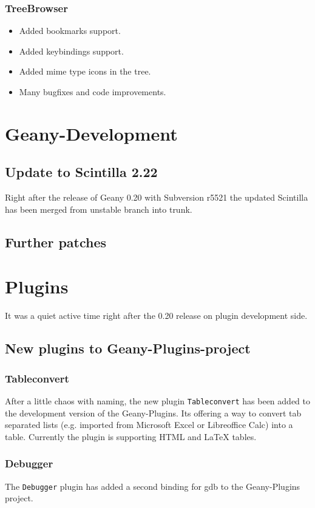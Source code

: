 \documentclass[%
paper=a4,%
fontsize=11pt,%
twoside=false,%
DIV18,
headsepline,
plainheadsepline,
footsepline,
plainfootsepline,
parskip=half,%
openany,%
]{scrartcl}
\begin{document}
\subsubsection{TreeBrowser}
\begin{itemize}
	\item Added bookmarks support.
	\item Added keybindings support.
	\item Added mime type icons in the tree.
	\item Many bugfixes and code improvements.
\end{itemize}

\section{Geany-Development}
\subsection{Update to Scintilla 2.22}

Right after the release of Geany 0.20 with Subversion r5521 the
updated Scintilla has been merged from unstable branch into trunk.

\subsection{Further patches}

\section{Plugins}

It was a quiet active time right after the 0.20 release on plugin
development side.

\subsection{New plugins to Geany-Plugins-project}
\subsubsection{Tableconvert}

After a little chaos with naming, the new plugin \texttt{Tableconvert}
has been added to the development version of the Geany-Plugins. Its
offering a way to convert tab separated lists (e.g. imported
from Microsoft Excel or Libreoffice Calc) into a table. Currently the
plugin is supporting HTML and \LaTeX{} tables.

\subsubsection{Debugger}

The \texttt{Debugger} plugin has added a second binding for gdb to
the Geany-Plugins project.
\end{document}
